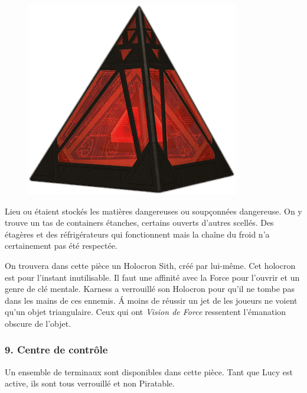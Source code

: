 \begin{figure}
    \vspace{-5\baselineskip}
    \centering\includegraphics[width=\linewidth]{_img/dos-au-muur/holocron-sith.png}
    \vspace{-2\baselineskip} 
\end{figure}
Lieu ou étaient stockés les matières dangereuses ou soupçonnées dangereuse. On y trouve un tas de containers étanches, certains ouverts d’autres scellés. Des étagères et des réfrigérateurs qui fonctionnent mais la chaîne du froid n’a certainement pas été respectée.

On trouvera dans cette pièce un Holocron Sith, créé par  lui-même. Cet holocron est pour l’instant inutilisable. Il faut une affinité avec la Force pour l’ouvrir et un genre de clé mentale. Karness a verrouillé son Holocron pour qu’il ne tombe pas dans les mains de ces ennemis. \'A moins de réussir un jet de  les joueurs ne voient qu’un objet triangulaire. Ceux qui ont \textit{Vision de Force} ressentent l’émanation obscure de l’objet.

\subsubsection{9. Centre de contrôle}
Un ensemble de terminaux sont disponibles dans cette pièce. Tant que Lucy est active, ils sont tous verrouillé et non Piratable.

